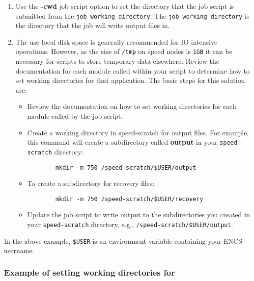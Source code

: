 \documentclass{easychair}
\begin{document}
\begin{enumerate}
	\item
Use the \textbf{-cwd} job script option to set the directory that the job script
 is submitted from the \texttt{job working directory}. The \texttt{job working directory} is the directory that the job will write output files in.
	\item
The use local disk space is generally recommended for IO intensive operations. However, as the size of \texttt{/tmp} on speed nodes 
is \texttt{1GB} it can be necessary for scripts to store temporary data 
elsewhere. 
Review the documentation for each module called within your script to 
determine how to set working directories for that application. 
The basic steps for this solution are:
\begin{itemize}
	\item
	Review the documentation on how to set working directories for 
	each module called by the job script.
	\item
	Create a working directory in speed-scratch for output files. 
	For example, this command will create a subdirectory called \textbf{output}
	 in your \verb!speed-scratch! directory:
	 \begin{verbatim}
		mkdir -m 750 /speed-scratch/$USER/output
	 \end{verbatim}
	\item
	To create a subdirectory for recovery files:
	\begin{verbatim}
		mkdir -m 750 /speed-scratch/$USER/recovery
	\end{verbatim}
	\item
	Update the job script to write output to the subdirectories you created in your \verb!speed-scratch! directory, e.g., \verb!/speed-scratch/$USER/output!.
	\end{itemize}
\end{enumerate}
In the above example, \verb!$USER! is an environment variable containing your ENCS username.
\subsubsection{Example of setting working directories for }
\end{document}
